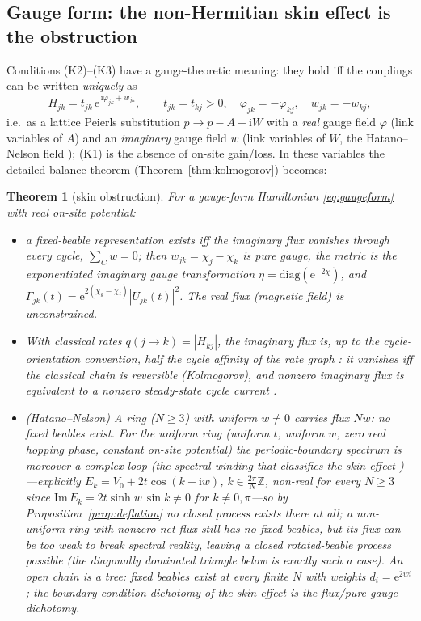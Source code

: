 \documentclass[11pt]{article}
\newtheorem{theorem}{Theorem}[section]
\theoremstyle{definition}
\theoremstyle{remark}
\newcommand{\ii}{\mathrm{i}}
\newcommand{\ee}{\mathrm{e}}
\newcommand{\Gam}{\Gamma}
\begin{document}
\subsection{Gauge form: the non-Hermitian skin effect is the obstruction}
\label{sec:skin}

Conditions (K2)--(K3) have a gauge-theoretic meaning: they hold iff the
couplings can be written \emph{uniquely} as
\begin{equation}
H_{jk}=t_{jk}\,\ee^{\,\ii\varphi_{jk}+w_{jk}},
\qquad
t_{jk}=t_{kj}>0,\quad
\varphi_{jk}=-\varphi_{kj},\quad
w_{jk}=-w_{kj},
\label{eq:gaugeform}
\end{equation}
i.e.\ as a lattice Peierls substitution $p\to p-A-\ii W$ with a \emph{real}
gauge field $\varphi$ (link variables of $A$) and an \emph{imaginary} gauge
field $w$ (link variables of $W$, the Hatano--Nelson field
\cite{HatanoNelson1996}); (K1) is the absence of on-site gain/loss. In
these variables the detailed-balance theorem
(Theorem~\ref{thm:kolmogorov}) becomes:

\begin{theorem}[skin obstruction]
\label{thm:skin}
For a gauge-form Hamiltonian \eqref{eq:gaugeform} with real on-site
potential:
\begin{itemize}
\item[(i)] a fixed-beable representation exists iff the \emph{imaginary
flux vanishes through every cycle}, $\sum_{C}w=0$; then $w_{jk}=
\chi_j-\chi_k$ is pure gauge, the metric is the exponentiated imaginary
gauge transformation $\eta=\mathrm{diag}(\ee^{-2\chi})$, and
$\Gam_{jk}(t)=\ee^{2(\chi_k-\chi_j)}|U_{jk}(t)|^{2}$. The \emph{real} flux
(magnetic field) is unconstrained.
\item[(ii)] With classical rates $q(j{\to}k)=|H_{kj}|$, the imaginary flux
is, up to the cycle-orientation convention, half the cycle affinity of the rate
graph \cite{Schnakenberg1976}: it vanishes iff the classical
chain is reversible (Kolmogorov), and nonzero imaginary flux is equivalent
to a nonzero steady-state cycle current \cite{Schnakenberg1976}.
\item[(iii)] (Hatano--Nelson) A ring ($N\ge3$) with uniform $w\ne0$ carries flux $Nw$:
no fixed beables exist. For the \emph{uniform} ring (uniform $t$,
uniform $w$, zero real hopping phase, constant on-site potential) the periodic-boundary
spectrum is moreover a
complex loop (the spectral winding that classifies the skin effect
\cite{Okuma2020})---explicitly $E_k=V_0+2t\cos(k-\ii w)$,
$k\in\tfrac{2\pi}{N}\mathbb{Z}$, non-real for every $N\ge3$ since
$\mathrm{Im}\,E_k=2t\sinh w\,\sin k\ne0$ for $k\ne0,\pi$---so by
Proposition~\ref{prop:deflation} no closed process exists there at all; a
non-uniform ring with nonzero net flux still has no fixed beables,
but its flux can be too
weak to break spectral reality, leaving a closed rotated-beable
process possible (the diagonally dominated triangle below is exactly
such a case). An open chain is a
tree: fixed beables exist at every finite $N$ with weights
$d_i=\ee^{2wi}$; the boundary-condition dichotomy of the skin effect is
the flux/pure-gauge dichotomy.
\end{itemize}
\end{theorem}
\end{document}
